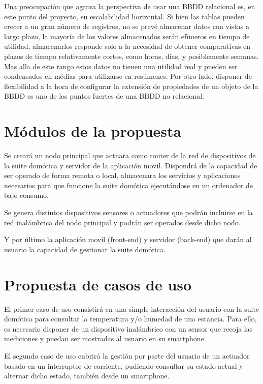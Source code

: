 Una preocupación que agrava la perspectiva de usar una BBDD relacional es, en este punto del proyecto, su escalabilidad horizontal. Si bien las tablas pueden crecer a un gran número de registros, no se prevé almacenar datos con vistas a largo plazo, la mayoría de los valores almacenados serán efímeros en tiempo de utilidad, almacenarlos responde solo a la necesidad de obtener comparativas en plazos de tiempo relativamente cortos, como horas, dias, y posiblemente semanas. Mas alla de este rango estos datos no tienen una utilidad real y pueden ser condensados en médias para utilizarse en resúmenes. Por otro lado, disponer de flexibilidad a la hora de configurar la extensión de propiedades de un objeto de la BBDD es uno de los puntos fuertes de una BBDD no relacional.

\vspace{1.5cm}


\section{Módulos de la propuesta}
\label{ch:Capitulo3.2}

Se creará un nodo principal que actuara como router de la red de dispositivos de la suite domótica y servidor de la aplicación movil. Dispondrá de la capacidad de ser operado de forma remota o local, almacenara los servicios y aplicaciones necesarios para que funcione la suite domótica ejecutándose en un ordenador de bajo consumo.

Se genera distintos dispositivos sensores o actuadores que podrán incluirse en la red inalámbrica del nodo principal y podrán ser operados desde dicho nodo.

Y por último la aplicación movil (front-end) y servidor (back-end) que darán al usuario la capacidad de gestionar la suite domótica.

\section{Propuesta de casos de uso}
\label{ch:Capitulo3.3}

El primer caso de uso consistirá en una simple interacción del usuario con la suite domótica para consultar la temperatura y/o humedad de una estancia. Para ello, es necesario disponer de un dispositivo inalámbrico con un sensor que recoja las mediciones y puedan ser mostradas al usuario en su smartphone.

El segundo caso de uso cubrirá la gestión por parte del usuario de un actuador basado en un interruptor de corriente, pudiendo consultar su estado actual y alternar dicho estado, también desde un smartphone.

